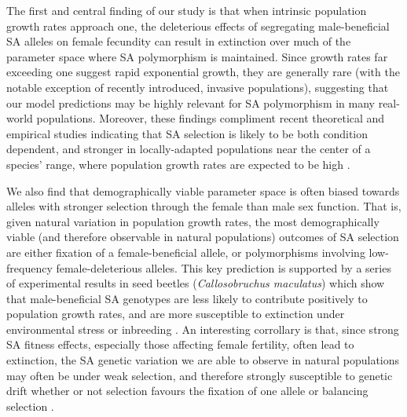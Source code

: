 \documentclass[11pt,draft]{article}
\begin{document}
The first and central finding of our study is that when intrinsic population growth rates approach one, the deleterious effects of segregating male-beneficial SA alleles on female fecundity can result in extinction over much of the parameter space where SA polymorphism is maintained. Since growth rates far exceeding one suggest rapid exponential growth, they are generally rare (with the notable exception of recently introduced, invasive populations), suggesting that our model predictions may be highly relevant for SA polymorphism in many real-world populations. Moreover, these findings compliment recent theoretical and empirical studies indicating that SA selection is likely to be both condition dependent, and stronger in locally-adapted populations near the center of a species' range, where population growth rates are expected to be high \citep{BergerEtAl2014, Connallon2015}.

We also find that demographically viable parameter space is often biased towards alleles with stronger selection through the female than male sex function. That is, given natural variation in population growth rates, the most demographically viable (and therefore observable in natural populations) outcomes of SA selection are either fixation of a female-beneficial allele, or polymorphisms involving low-frequency female-deleterious alleles. This key prediction is supported by a series of experimental results in seed beetles ({\itshape Callosobruchus maculatus}) which show that male-beneficial SA genotypes are less likely to contribute positively to population growth rates, and are more susceptible to extinction under environmental stress or inbreeding \citep{BergerEtAl2014, berger2016intralocus, grieshop2017male}. An interesting corrollary is that, since strong SA fitness effects, especially those affecting female fertility, often lead to extinction, the SA genetic variation we are able to observe in natural populations may often be under weak selection, and therefore strongly susceptible to genetic drift whether or not selection favours the fixation of one allele or balancing selection \citep{ConnallonClark2012}. 
\end{document}
